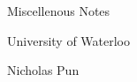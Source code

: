 \documentclass[12pt]{report}
\begin{document}
\begin{titlepage}
  \centering
  \vspace*{2in}
  {\huge Miscellenous Notes}\par
  \vspace{0.5in}
  {\large University of Waterloo}\par
  {\large Nicholas Pun}\par
\end{titlepage}
 
\tableofcontents
\clearpage



\end{document}
